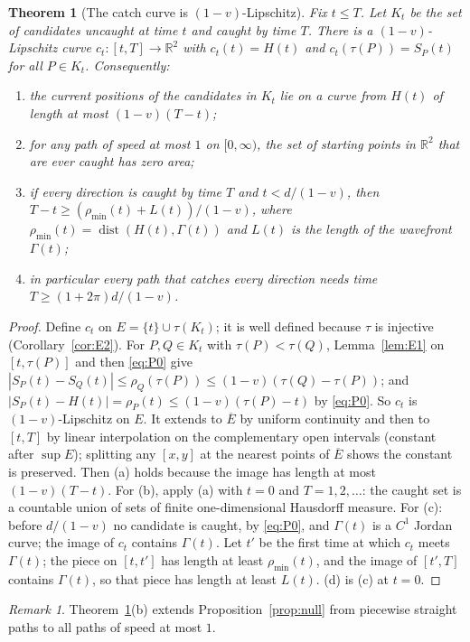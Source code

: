 \documentclass[11pt]{article}
\newtheorem{theorem}{Theorem}
\theoremstyle{remark}\newtheorem{remark}{Remark}
\newcommand{\R}{\mathbb{R}}
\begin{document}
\begin{theorem}[The catch curve is $(1-v)$-Lipschitz]\label{thm:E3}
Fix $t\le T$. Let $K_t$ be the set of candidates uncaught at time $t$ and caught by time $T$. There is a $(1-v)$-Lipschitz curve
$c_t:[t,T]\to\R^2$ with $c_t(t)=H(t)$ and $c_t(\tau(P))=S_P(t)$ for all $P\in K_t$. Consequently:
\begin{enumerate}
\item[(a)] the current positions of the candidates in $K_t$ lie on a curve from $H(t)$ of length at most $(1-v)(T-t)$;
\item[(b)] for any path of speed at most $1$ on $[0,\infty)$, the set of starting points in $\R^2$ that are ever caught has zero area;
\item[(c)] if every direction is caught by time $T$ and $t<d/(1-v)$, then $T-t\ge(\rho_{\min}(t)+L(t))/(1-v)$, where
$\rho_{\min}(t)=\operatorname{dist}(H(t),\Gamma(t))$ and $L(t)$ is the length of the wavefront $\Gamma(t)$;
\item[(d)] in particular every path that catches every direction needs time $T\ge(1+2\pi)d/(1-v)$.
\end{enumerate}
\end{theorem}
\begin{proof}
Define $c_t$ on $E=\{t\}\cup\tau(K_t)$; it is well defined because $\tau$ is injective (Corollary~\ref{cor:E2}). For
$P,Q\in K_t$ with $\tau(P)<\tau(Q)$, Lemma~\ref{lem:E1} on $[t,\tau(P)]$ and then \eqref{eq:P0} give
$|S_P(t)-S_Q(t)|\le\rho_Q(\tau(P))\le(1-v)(\tau(Q)-\tau(P))$; and $|S_P(t)-H(t)|=\rho_P(t)\le(1-v)(\tau(P)-t)$ by \eqref{eq:P0}. So
$c_t$ is $(1-v)$-Lipschitz on $E$. It extends to $\overline E$ by uniform continuity and then to $[t,T]$ by linear interpolation on
the complementary open intervals (constant after $\sup E$); splitting any $[x,y]$ at the nearest points of $\overline E$ shows the
constant is preserved. Then (a) holds because the image has length at most $(1-v)(T-t)$. For (b), apply (a) with $t=0$ and
$T=1,2,\dots$: the caught set is a countable union of sets of finite one-dimensional Hausdorff measure. For (c): before
$d/(1-v)$ no candidate is caught, by \eqref{eq:P0}, and $\Gamma(t)$ is a $C^1$ Jordan curve; the image of $c_t$ contains $\Gamma(t)$.
Let $t'$ be the first time at which $c_t$ meets $\Gamma(t)$; the piece on $[t,t']$ has length at least $\rho_{\min}(t)$, and the
image of $[t',T]$ contains $\Gamma(t)$, so that piece has length at least $L(t)$. (d) is (c) at $t=0$.
\end{proof}
\begin{remark}
Theorem~\ref{thm:E3}(b) extends Proposition~\ref{prop:null} from piecewise straight paths to all paths of speed at most $1$.
\end{remark}
\end{document}

